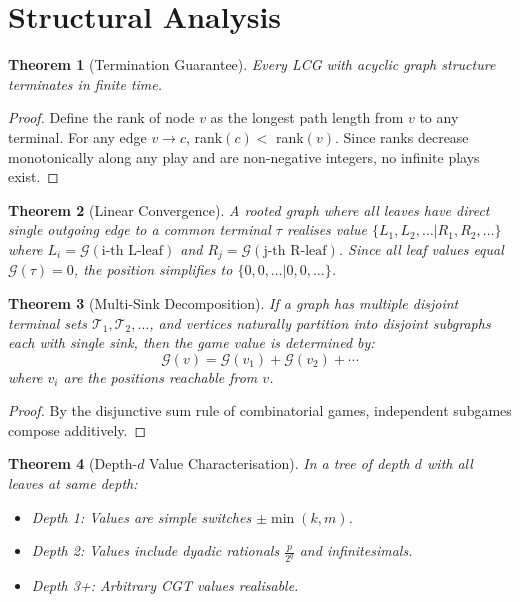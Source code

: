 \documentclass[10pt,a4paper,twocolumn]{article}
\newcommand{\Gv}[1]{\mathcal{G}(#1)}
\theoremstyle{plain}
\newtheorem{theorem}{Theorem}[section]
\theoremstyle{definition}
\theoremstyle{remark}
\begin{document}
\section{Structural Analysis}

\begin{theorem}[Termination Guarantee]
Every LCG with acyclic graph structure terminates in finite time.
\end{theorem}

\begin{proof}
Define the rank of node $v$ as the longest path length from $v$ to any terminal. For any edge $v \to c$, rank$(c) <$ rank$(v)$. Since ranks decrease monotonically along any play and are non-negative integers, no infinite plays exist.
\end{proof}

\begin{theorem}[Linear Convergence]
A rooted graph where all leaves have direct single outgoing edge to a common terminal $\tau$ realises value $\{L_1, L_2, \ldots | R_1, R_2, \ldots\}$ where $L_i = \Gv{\text{i-th L-leaf}}$ and $R_j = \Gv{\text{j-th R-leaf}}$. Since all leaf values equal $\Gv{\tau} = 0$, the position simplifies to $\{0, 0, \ldots | 0, 0, \ldots\}$.
\end{theorem}

\begin{theorem}[Multi-Sink Decomposition]
If a graph has multiple disjoint terminal sets $\mathcal{T}_1, \mathcal{T}_2, \ldots$, and vertices naturally partition into disjoint subgraphs each with single sink, then the game value is determined by:
\[
\Gv{v} = \Gv{v_1} + \Gv{v_2} + \cdots
\]
where $v_i$ are the positions reachable from $v$.
\end{theorem}

\begin{proof}
By the disjunctive sum rule of combinatorial games, independent subgames compose additively.
\end{proof}

\begin{theorem}[Depth-$d$ Value Characterisation]
In a tree of depth $d$ with all leaves at same depth:
\begin{itemize}
\item Depth 1: Values are simple switches $\pm\min(k,m)$.
\item Depth 2: Values include dyadic rationals $\frac{p}{2^q}$ and infinitesimals.
\item Depth 3+: Arbitrary CGT values realisable.
\end{itemize}
\end{theorem}
\end{document}
